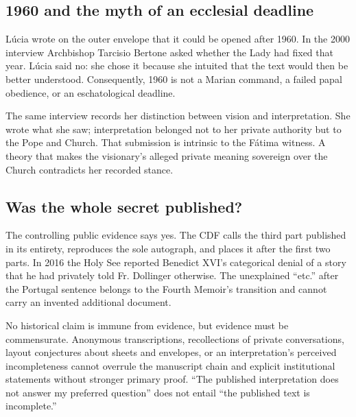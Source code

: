 \subsection{1960 and the myth of an ecclesial deadline}

Lúcia wrote on the outer envelope that it could be opened after 1960. In the 2000 interview Archbishop Tarcisio Bertone asked whether the Lady had fixed that year. Lúcia said no: she chose it because she intuited that the text would then be better understood. Consequently, 1960 is not a Marian command, a failed papal obedience, or an eschatological deadline.

The same interview records her distinction between vision and interpretation. She wrote what she saw; interpretation belonged not to her private authority but to the Pope and Church. That submission is intrinsic to the Fátima witness. A theory that makes the visionary's alleged private meaning sovereign over the Church contradicts her recorded stance.

\subsection{Was the whole secret published?}

The controlling public evidence says yes. The CDF calls the third part published in its entirety, reproduces the sole autograph, and places it after the first two parts. In 2016 the Holy See reported Benedict XVI's categorical denial of a story that he had privately told Fr. Dollinger otherwise. The unexplained “etc.” after the Portugal sentence belongs to the Fourth Memoir's transition and cannot carry an invented additional document.

No historical claim is immune from evidence, but evidence must be commensurate. Anonymous transcriptions, recollections of private conversations, layout conjectures about sheets and envelopes, or an interpretation's perceived incompleteness cannot overrule the manuscript chain and explicit institutional statements without stronger primary proof. “The published interpretation does not answer my preferred question” does not entail “the published text is incomplete.”
